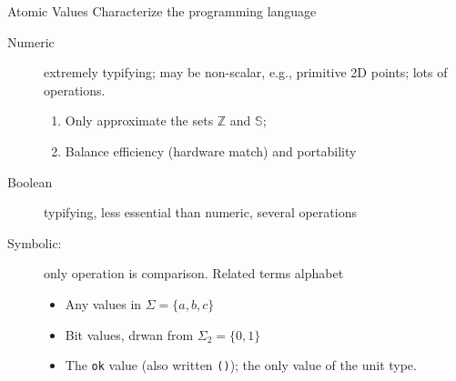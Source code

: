 \documentclass[aspectratio=169]{beamer}
\begin{document}
\begin{frame}[fragile]{Atomic Values}
Characterize the programming language
\begin{description}
\item [Numeric] extremely typifying; may be non-scalar, e.g., primitive 2D points; lots of operations.  
    \begin{enumerate}
        \item Only approximate the sets $\mathbb Z$ and $\mathbb S$; 
        \item Balance efficiency (hardware match) and portability
    \end{enumerate}
\item [Boolean] typifying, less essential than numeric, several operations
\item [Symbolic:] only operation is comparison. Related terms alphabet
    \begin{itemize}
     \item Any values in $\Sigma = \{a,b,c\}$
     \item Bit values, drwan from  $\Sigma_2 = \{0,1\}$
     \item The \texttt{ok} value (also written \texttt{()}); the only
        value of the unit type.
    \end{itemize}
\end{description}
\end{frame}
\end{document}
